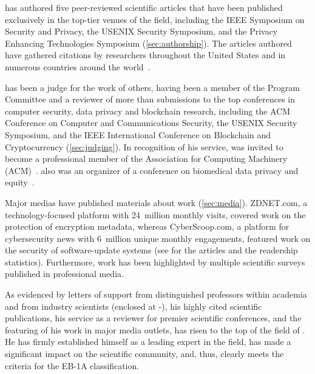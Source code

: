 \dr has authored five peer-reviewed scientific articles that have been
published exclusively in the top-tier venues of the field, including the IEEE
Symposium on Security and Privacy, the USENIX Security Symposium, and the
Privacy Enhancing Technologies Symposium (\cref{sec:authorship}).
The articles \dr authored have gathered \numcitations citations by
researchers throughout the United States and in numerous countries around the
world~\cite{gscholar}.

\dr has been a judge for the work of others, having been a member of the
Program Committee and a reviewer of more than \numreviews submissions to the top
conferences in computer security, data privacy and blockchain research,
including the ACM Conference on Computer and Communications Security, the USENIX
Security Symposium, and the IEEE International Conference on Blockchain and
Cryptocurrency (\cref{sec:judging}).
In recognition of his service, \dr was invited to become a professional member
of the Association for Computing Machinery (ACM)~\cite{acm_membership}.
\dr also was an organizer of a conference on biomedical data privacy and
equity~\cite{recomb-prieq}. 

Major medias have published materials about \drs work (\cref{sec:media}).
ZDNET.com, a technology-focused platform with 24~million
monthly visits, covered \drs work on the protection of encryption metadata,
whereas CyberScoop.com, a platform for cybersecurity news with 6~million unique
monthly engagements, featured \drs work on the security of software-update
systems (see  for the articles and the readership statistics).
Furthermore, \drs work has been highlighted by multiple scientific surveys
published in professional media.

As evidenced by \emph{\textit{\numletters}} letters of support from
distinguished professors within academia and from industry scientists (enclosed
at -), his highly cited
scientific publications, his service as a reviewer for premier scientific
conferences, and the featuring of his work in major media outlets, \dr has risen
to the top of the field of \dpcs.
He has firmly established himself as a leading expert in the field, has made
a significant impact on the scientific community, and, thus, clearly meets the
criteria for the EB-1A classification.